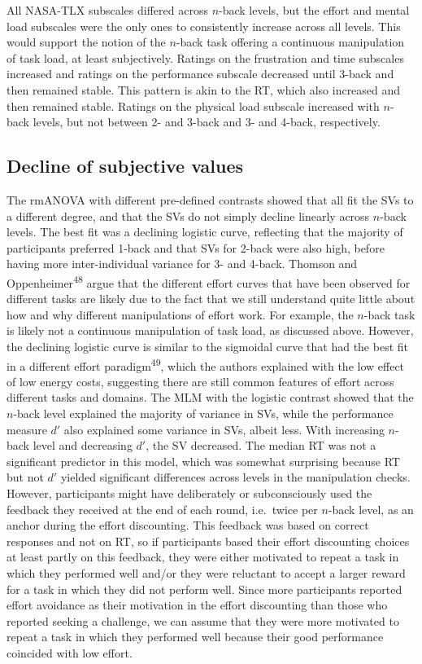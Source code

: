 \documentclass[
  man,floatsintext]{apa6}
\begin{document}
All NASA-TLX subscales differed across \(n\)-back levels, but the effort and mental load subscales were the only ones to consistently increase across all levels.
This would support the notion of the \(n\)-back task offering a continuous manipulation of task load, at least subjectively.
Ratings on the frustration and time subscales increased and ratings on the performance subscale decreased until 3-back and then remained stable.
This pattern is akin to the RT, which also increased and then remained stable.
Ratings on the physical load subscale increased with \(n\)-back levels, but not between 2- and 3-back and 3- and 4-back, respectively.

\hypertarget{decline-of-subjective-values-1}{%
\subsection{Decline of subjective values}\label{decline-of-subjective-values-1}}

The rmANOVA with different pre-defined contrasts showed that all fit the SVs to a different degree, and that the SVs do not simply decline linearly across \(n\)-back levels.
The best fit was a declining logistic curve, reflecting that the majority of participants preferred 1-back and that SVs for 2-back were also high, before having more inter-individual variance for 3- and 4-back.
Thomson and Oppenheimer\textsuperscript{48} argue that the different effort curves that have been observed for different tasks are likely due to the fact that we still understand quite little about how and why different manipulations of effort work.
For example, the \(n\)-back task is likely not a continuous manipulation of task load, as discussed above.
However, the declining logistic curve is similar to the sigmoidal curve that had the best fit in a different effort paradigm\textsuperscript{49}, which the authors explained with the low effect of low energy costs, suggesting there are still common features of effort across different tasks and domains.
The MLM with the logistic contrast showed that the \(n\)-back level explained the majority of variance in SVs, while the performance measure \(d'\) also explained some variance in SVs, albeit less.
With increasing \(n\)-back level and decreasing \(d'\), the SV decreased.
The median RT was not a significant predictor in this model, which was somewhat surprising because RT but not \(d'\) yielded significant differences across levels in the manipulation checks.
However, participants might have deliberately or subconsciously used the feedback they received at the end of each round, i.e.~twice per \(n\)-back level, as an anchor during the effort discounting.
This feedback was based on correct responses and not on RT, so if participants based their effort discounting choices at least partly on this feedback, they were either motivated to repeat a task in which they performed well and/or they were reluctant to accept a larger reward for a task in which they did not perform well.
Since more participants reported effort avoidance as their motivation in the effort discounting than those who reported seeking a challenge, we can assume that they were more motivated to repeat a task in which they performed well because their good performance coincided with low effort.
\end{document}
